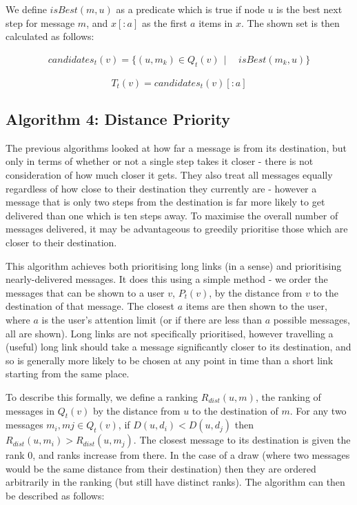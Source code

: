 \documentclass[bsc,frontabs,twoside,singlespacing,parskip,deptreport]{infthesis}     %
\begin{document}
We define $isBest(m, u)$ as a predicate which is true if node $u$ is the best next step for message $m$, and $x[:a]$ as the first $a$ items in $x$. The shown set is then calculated as follows:

\begin{equation}
\begin{split}
candidates_{t}(v) = \{ (u, m_{k}) \in Q_{t}(v) \:\: | \:\: & isBest(m_{k}, u) \}
\end{split}
\end{equation}

\begin{equation}
T_{t}(v) = candidates_{t}(v)[:a]
\end{equation}

\subsection{Algorithm 4: Distance Priority}
The previous algorithms looked at how far a message is from its destination, but only in terms of whether or not a single step takes it closer - there is not consideration of how much closer it gets. They also treat all messages equally regardless of how close to their destination they currently are - however a message that is only two steps from the destination is far more likely to get delivered than one which is ten steps away. To maximise the overall number of messages delivered, it may be advantageous to greedily prioritise those which are closer to their destination.

This algorithm achieves both prioritising long links (in a sense) and prioritising nearly-delivered messages. It does this using a simple method - we order the messages that can be shown to a user $v$, $P_{t}(v)$, by the distance from $v$ to the destination of that message. The closest $a$ items are then shown to the user, where $a$ is the user's attention limit (or if there are less than $a$ possible messages, all are shown). Long links are not specifically prioritised, however travelling a (useful) long link should take a message significantly closer to its destination, and so is generally more likely to be chosen at any point in time than a short link starting from the same place.

To describe this formally, we define a ranking $R_{dist}(u, m)$, the ranking of messages in $Q_{t}(v)$ by the distance from $u$ to the destination of $m$. For any two messages $m_{i}, m{j} \in Q_{t}(v)$, if $D(u, d_{i}) < D(u, d_{j})$ then $R_{dist}(u, m_{i}) > R_{dist}(u, m_{j})$. The closest message to its destination is given the rank 0, and ranks increase from there. In the case of a draw (where two messages would be the same distance from their destination) then they are ordered arbitrarily in the ranking (but still have distinct ranks). The algorithm can then be described as follows:
\end{document}
